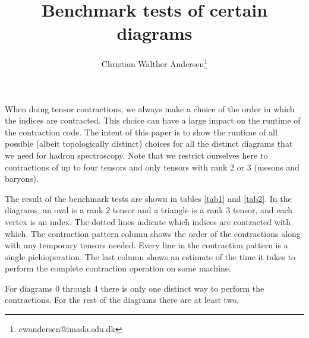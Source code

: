 \documentclass[paper=a4, oneside]{memoir}
\title{Benchmark tests of certain diagrams}
\author{Christian Walther Andersen\thanks{cwandersen@imada.sdu.dk}}
\newcommand{\packagename}{pichi}
\begin{document}
\maketitle %

When doing tensor contractions, we always make a choice of the order in which 
the indices are contracted. This choice can have a large impact on the runtime 
of the contraction code. The intent of this paper is to show the runtime of all 
possible (albeit topologically distinct) choices for all the distinct diagrams 
that we need for hadron spectroscopy. Note that we restrict ourselves here to 
contractions of up to four tensors and only tensors with rank 2 or 3 (mesons 
and baryons).

The result of the benchmark tests are shown in tables \ref{tab1} and 
\ref{tab2}. In the diagrams, an oval is a rank 2 tensor and a triangle is a 
rank 3 tensor, and each vertex is an index. The dotted lines indicate which 
indices are contracted with which. The contraction pattern column shows the 
order of the contractions along with any temporary tensors needed. Every line 
in the contraction pattern is a single \packagename operation. The last 
column shows an estimate of the time it takes to perform the complete 
contraction operation on some machine.

For diagrams 0 through 4 there is only one distinct way to perform the 
contractions. For the rest of the diagrams there are at least two.



\end{document}
